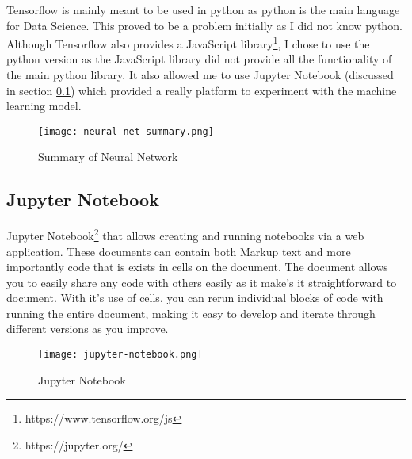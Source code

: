 Tensorflow is mainly meant to be used in python as python is the main language for Data Science. This proved to be a problem initially as I did not know python. Although Tensorflow also provides a JavaScript library\footnote{https://www.tensorflow.org/js}, I chose to use the python version as the JavaScript library did not provide all the functionality of the main python library. It also allowed me to use Jupyter Notebook (discussed in section \ref{jupyterNotebook}) which provided a really platform to experiment with the machine learning model.

\begin{figure}[ht]
    \centering
    \texttt{[image: neural-net-summary.png]}
    \caption{Summary of Neural Network}
    \label{fig:neuralNetworkSummary}
\end{figure}

\subsection{Jupyter Notebook} \label{jupyterNotebook}
Jupyter Notebook\footnote{https://jupyter.org/} that allows creating and running notebooks via a web application. These documents can contain both Markup text and more importantly code that is exists in cells on the document. The document allows you to easily share any code with others easily as it make's it straightforward to document. With it's use of cells, you can rerun individual blocks of code with running the entire document, making it easy to develop and iterate through different versions as you improve.
\begin{figure}[ht]
    \centering
    \texttt{[image: jupyter-notebook.png]}
    \caption{Jupyter Notebook}
    \label{fig:JupyterNotebook}
\end{figure}

